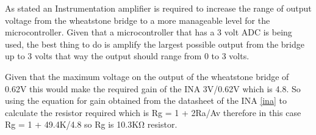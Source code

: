 As stated an Instrumentation amplifier is required to increase the range of output voltage from the wheatstone bridge to a more manageable level for the microcontroller. Given that a microcontroller that has a 3 volt ADC is being used, the best thing to do is amplify the largest possible output from the bridge up to 3 volts that way the output should range from 0 to 3 volts. 

Given that the maximum voltage on the output of the wheatstone bridge of 0.62V this would make the required gain of the INA 3V/0.62V which is 4.8. So using the equation for gain obtained from the datasheet of the INA \ref{ina} to calculate the resistor required which is Rg = 1 + 2Ra/Av therefore in this case Rg = 1 + 49.4K/4.8
so Rg is 10.3KΩ resistor. 